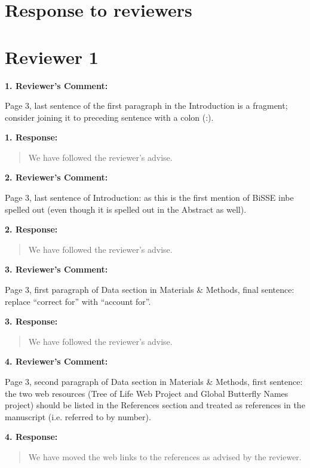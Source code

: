 \documentclass[]{article}
\date{}
\begin{document}
\section{Response to reviewers}\label{response-to-reviewers}

\section{Reviewer 1}\label{reviewer-1}

\textbf{1. Reviewer's Comment:}

 Page 3, last sentence of the first paragraph in the Introduction is a fragment; consider joining it to
preceding sentence with a colon (:).


\textbf{1. Response:}

\begin{quote}
\color{blue}
We have followed the reviewer's advise.
\end{quote}

\textbf{2. Reviewer's Comment:}

Page 3, last sentence of Introduction: as this is the first mention of BiSSE inbe spelled out (even though it is spelled out in the Abstract as well).


\textbf{2. Response:}

\begin{quote}
\color{blue}
We have followed the reviewer's advise.
\end{quote}

\textbf{3. Reviewer's Comment:}

 Page 3, first paragraph of Data section in Materials \& Methods, final sentence: replace “correct for”
with “account for”.


\textbf{3. Response:}

\begin{quote}
\color{blue}
We have followed the reviewer's advise.
\end{quote}

\textbf{4. Reviewer's Comment:}

Page 3, second paragraph of Data section in Materials \& Methods, first sentence: the two web
resources (Tree of Life Web Project and Global Butterfly Names project) should be listed in the
References section and treated as references in the manuscript (i.e. referred to by number).


\textbf{4. Response:}

\begin{quote}
\color{blue}
We have moved the web links to the references as advised by the reviewer.
\end{quote}
\end{document}
